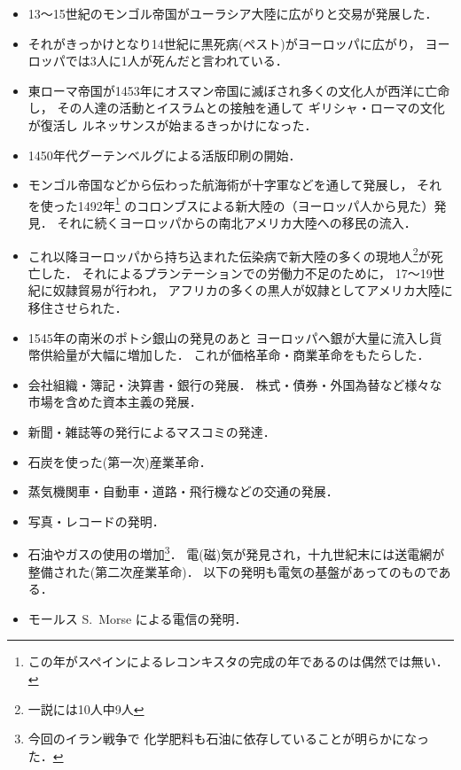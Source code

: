 \begin{itemize}
   \item 
      13〜15世紀のモンゴル帝国がユーラシア大陸に広がりと交易が発展した．
   \item 
     それがきっかけとなり14世紀に黒死病(ペスト)がヨーロッパに広がり，
     ヨーロッパでは3人に1人が死んだと言われている．
   \item 
      東ローマ帝国が1453年にオスマン帝国に滅ぼされ多くの文化人が西洋に亡命し，
      その人達の活動とイスラムとの接触を通して
      ギリシャ・ローマの文化が復活し
      ルネッサンスが始まるきっかけになった．
   \item 
      1450年代グーテンベルグによる活版印刷の開始．
  \item
     モンゴル帝国などから伝わった航海術が十字軍などを通して発展し，
     それを使った1492年\footnote{この年がスペインによるレコンキスタの完成の年であるのは偶然では無い．}
     のコロンブスによる新大陸の（ヨーロッパ人から見た）発見．
     それに続くヨーロッパからの南北アメリカ大陸への移民の流入．
     
  \item
     これ以降ヨーロッパから持ち込まれた伝染病で新大陸の多くの現地人\footnote{一説には10人中9人}が死亡した．
     それによるプランテーションでの労働力不足のために，
     17〜19世紀に奴隷貿易が行われ，
     アフリカの多くの黒人が奴隷としてアメリカ大陸に移住させられた．

  \item
      1545年の南米のポトシ銀山の発見のあと
      ヨーロッパへ銀が大量に流入し貨幣供給量が大幅に増加した．
      これが価格革命・商業革命をもたらした．
   \item 
      会社組織・簿記・決算書・銀行の発展．
      株式・債券・外国為替など様々な市場を含めた資本主義の発展．
   \item 
      新聞・雑誌等の発行によるマスコミの発達．
   \item 
      石炭を使った(第一次)産業革命．
   \item 
      蒸気機関車・自動車・道路・飛行機などの交通の発展．
   \item 
      写真・レコードの発明．
   \item 
      石油やガスの使用の増加\footnote{今回のイラン戦争で
      化学肥料も石油に依存していることが明らかになった．}．
      電(磁)気が発見され，十九世紀末には送電網が整備された(第二次産業革命)．
      以下の発明も電気の基盤があってのものである．
 
    \item 
      モールス S.~Morse による電信の発明．    


\end{itemize}

